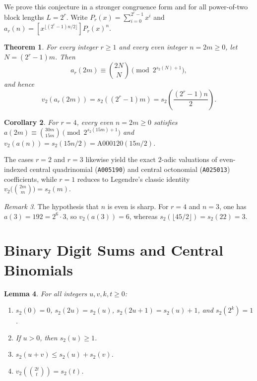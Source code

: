 \documentclass[11pt]{article}
\newtheorem{theorem}{Theorem}[section]
\newtheorem{lemma}[theorem]{Lemma}
\newtheorem{corollary}[theorem]{Corollary}
\theoremstyle{remark}
\newtheorem{remark}[theorem]{Remark}
\begin{document}
We prove this conjecture in a stronger congruence form and for all power-of-two block lengths $L = 2^r$. Write $P_r(x) = \sum_{i=0}^{2^r - 1} x^i$ and $a_r(n) = [x^{\lfloor (2^r - 1)n/2 \rfloor}] P_r(x)^n$.

\begin{theorem}\label{thm:main}
For every integer $r \ge 1$ and every even integer $n = 2m \ge 0$, let $N = (2^r - 1)m$. Then
\[
  a_r(2m) \equiv \binom{2N}{N} \pmod{2^{s_2(N) + 1}},
\]
and hence
\[
  v_2(a_r(2m)) = s_2\!\left((2^r - 1)m\right) = s_2\!\left(\frac{(2^r - 1)n}{2}\right).
\]
\end{theorem}

\begin{corollary}\label{cor:A402341}
For $r = 4$, every even $n = 2m \ge 0$ satisfies $a(2m) \equiv \binom{30m}{15m} \pmod{2^{s_2(15m)+1}}$ and $v_2(a(n)) = s_2(15n/2) = \mathrm{A000120}(15n/2)$.
\end{corollary}

The cases $r = 2$ and $r = 3$ likewise yield the exact $2$-adic valuations of even-indexed central quadrinomial (\texttt{A005190}) and central octonomial (\texttt{A025013}) coefficients, while $r = 1$ reduces to Legendre's classic identity $v_2\bigl(\binom{2m}{m}\bigr) = s_2(m)$.

\begin{remark}
The hypothesis that $n$ is even is sharp. For $r = 4$ and $n = 3$, one has $a(3) = 192 = 2^6 \cdot 3$, so $v_2(a(3)) = 6$, whereas $s_2(\lfloor 45/2 \rfloor) = s_2(22) = 3$.
\end{remark}

\section{Binary Digit Sums and Central Binomials}

\begin{lemma}\label{lem:s2}
For all integers $u, v, k, t \ge 0$:
\begin{enumerate}
  \item $s_2(0) = 0$, $s_2(2u) = s_2(u)$, $s_2(2u+1) = s_2(u) + 1$, and $s_2(2^k) = 1$.
  \item If $u > 0$, then $s_2(u) \ge 1$.
  \item $s_2(u + v) \le s_2(u) + s_2(v)$.
  \item $v_2\!\left(\binom{2t}{t}\right) = s_2(t)$.
\end{enumerate}
\end{lemma}
\end{document}
